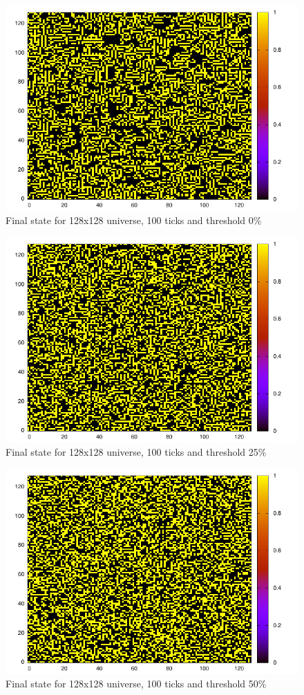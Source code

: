 \documentclass[11pt]{article}
\numberwithin{figure}{section}
\begin{document}
\begin{figure}[t]
\centering
   \includegraphics{plts/gol-128-100-0-16.pdf}
\caption{Final state for 128x128 universe, 100 ticks and threshold 0\%}
\label{fig:0}
\end{figure}
\begin{figure}[t]
\centering
   \includegraphics{plts/gol-128-100-25-16.pdf}
\caption{Final state for 128x128 universe, 100 ticks and threshold 25\%}
\label{fig:25}
\end{figure}
\begin{figure}[t]
\centering
   \includegraphics{plts/gol-128-100-50-16.pdf}
\caption{Final state for 128x128 universe, 100 ticks and threshold 50\%}
\label{fig:50}
\end{figure}
\end{document}
